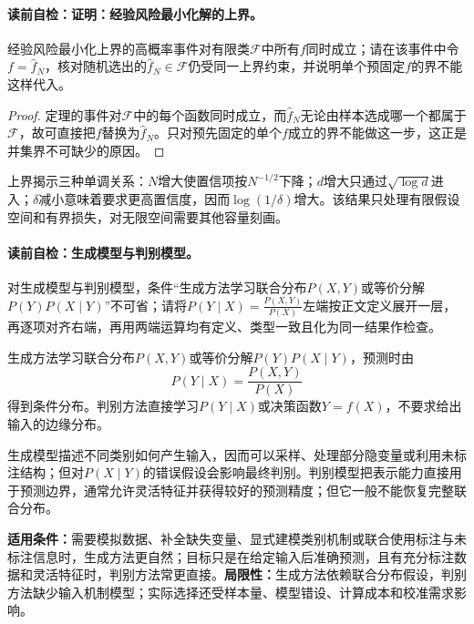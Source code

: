 \paragraph{读前自检：证明：经验风险最小化解的上界。}经验风险最小化上界的高概率事件对有限类$\mathcal F$中所有$f$同时成立；请在该事件中令$f=\widehat f_N$，核对随机选出的$\widehat f_N\in\mathcal F$仍受同一上界约束，并说明单个预固定$f$的界不能这样代入。\par

\begin{proof}
定理的事件对$\mathcal F$中的每个函数同时成立，而$\widehat f_N$无论由样本选成哪一个都属于$\mathcal F$，故可直接把$f$替换为$\widehat f_N$。只对预先固定的单个$f$成立的界不能做这一步，这正是并集界不可缺少的原因。
\end{proof}

上界揭示三种单调关系：$N$增大使置信项按$N^{-1/2}$下降；$d$增大只通过$\sqrt{\log d}$进入；$\delta$减小意味着要求更高置信度，因而$\log(1/\delta)$增大。该结果只处理有限假设空间和有界损失，对无限空间需要其他容量刻画。


\paragraph{读前自检：生成模型与判别模型。}对生成模型与判别模型，条件“生成方法学习联合分布$P(X,Y)$或等价分解$P(Y)P(X\mid Y)$”不可省；请将$P(Y\mid X)=\frac{P(X,Y)}{P(X)}$左端按正文定义展开一层，再逐项对齐右端，再用两端运算均有定义、类型一致且化为同一结果作检查。\par

\begin{definition}[生成方法与判别方法]
生成方法学习联合分布$P(X,Y)$或等价分解$P(Y)P(X\mid Y)$，预测时由
\[
P(Y\mid X)=\frac{P(X,Y)}{P(X)}
\]
得到条件分布。判别方法直接学习$P(Y\mid X)$或决策函数$Y=f(X)$，不要求给出输入的边缘分布。
\end{definition}

生成模型描述不同类别如何产生输入，因而可以采样、处理部分隐变量或利用未标注结构；但对$P(X\mid Y)$的错误假设会影响最终判别。判别模型把表示能力直接用于预测边界，通常允许灵活特征并获得较好的预测精度；但它一般不能恢复完整联合分布。

\label{struct:V1-C10-CH28}
\label{struct:V1-C10-CH29}
\begin{applicabilitybox}
\textbf{适用条件：}需要模拟数据、补全缺失变量、显式建模类别机制或联合使用标注与未标注信息时，生成方法更自然；目标只是在给定输入后准确预测，且有充分标注数据和灵活特征时，判别方法常更直接。\textbf{局限性：}生成方法依赖联合分布假设，判别方法缺少输入机制模型；实际选择还受样本量、模型错设、计算成本和校准需求影响。
\end{applicabilitybox}

